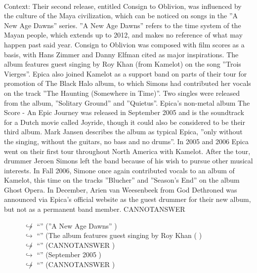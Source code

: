 \documentclass[11pt,a4paper, onecolumn]{article}
\begin{document}
\\ Context: Their second release, entitled Consign to Oblivion, was influenced by the culture of the Maya civilization, which can be noticed on songs in the ''A New Age Dawns'' series. ''A New Age Dawns'' refers to the time system of the Mayan people, which extends up to 2012, and makes no reference of what may happen past said year. Consign to Oblivion was composed with film scores as a basis, with Hans Zimmer and Danny Elfman cited as major inspirations. The album features guest singing by Roy Khan (from Kamelot) on the song ''Trois Vierges''. Epica also joined Kamelot as a support band on parts of their tour for promotion of The Black Halo album, to which Simons had contributed her vocals on the track ''The Haunting (Somewhere in Time)''. Two singles were released from the album, ''Solitary Ground'' and ''Quietus''. Epica's non-metal album The Score - An Epic Journey was released in September 2005 and is the soundtrack for a Dutch movie called Joyride, though it could also be considered to be their third album. Mark Jansen describes the album as typical Epica, ''only without the singing, without the guitars, no bass and no drums''. In 2005 and 2006 Epica went on their first tour throughout North America with Kamelot. After the tour, drummer Jeroen Simons left the band because of his wish to pursue other musical interests. In Fall 2006, Simone once again contributed vocals to an album of Kamelot, this time on the tracks ''Blucher'' and ''Season's End'' on the album Ghost Opera. In December, Arien van Weesenbeek from God Dethroned was announced via Epica's official website as the guest drummer for their new album, but not as a permanent band member. CANNOTANSWER

\begin{figure}[t] \small \begin{tcolorbox}[boxsep=0pt,left=5pt,right=0pt,top=2pt,colback = yellow!5] \begin{dialogue}
 \small 
\colorbox{pink!25}{$\not\hookrightarrow$}
{ ``'' (''A New Age Dawns'' ) }
\\
\colorbox{pink!25}{$\hookrightarrow$}
{ ``'' (The album features guest singing by Roy Khan ( ) }
\\
\colorbox{pink!25}{$\not\hookrightarrow$}
{ ``'' (CANNOTANSWER ) }
\\
\colorbox{pink!25}{$\hookrightarrow$}
{ ``'' (September 2005 ) }
\\
\colorbox{pink!25}{$\not\hookrightarrow$}
{ ``'' (CANNOTANSWER ) }
\\
 \end{dialogue}\end{tcolorbox}\end{figure}
\end{document}
